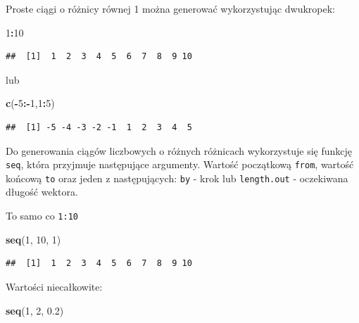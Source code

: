 \documentclass[]{book}
\newenvironment{Shaded}{\begin{snugshade}}{\end{snugshade}}
\newcommand{\KeywordTok}[1]{\textcolor[rgb]{0.13,0.29,0.53}{\textbf{#1}}}
\newcommand{\DecValTok}[1]{\textcolor[rgb]{0.00,0.00,0.81}{#1}}
\newcommand{\FloatTok}[1]{\textcolor[rgb]{0.00,0.00,0.81}{#1}}
\newcommand{\OperatorTok}[1]{\textcolor[rgb]{0.81,0.36,0.00}{\textbf{#1}}}
\newcommand{\NormalTok}[1]{#1}
\begin{document}
Proste ciągi o różnicy równej 1 można generować wykorzystując dwukropek:

\begin{Shaded}
\begin{Highlighting}[]
\DecValTok{1}\OperatorTok{:}\DecValTok{10}
\end{Highlighting}
\end{Shaded}

\begin{verbatim}
##  [1]  1  2  3  4  5  6  7  8  9 10
\end{verbatim}

lub

\begin{Shaded}
\begin{Highlighting}[]
\KeywordTok{c}\NormalTok{(}\OperatorTok{-}\DecValTok{5}\OperatorTok{:-}\DecValTok{1}\NormalTok{,}\DecValTok{1}\OperatorTok{:}\DecValTok{5}\NormalTok{)}
\end{Highlighting}
\end{Shaded}

\begin{verbatim}
##  [1] -5 -4 -3 -2 -1  1  2  3  4  5
\end{verbatim}

Do generowania ciągów liczbowych o różnych różnicach wykorzystuje się
funkcję \texttt{seq}, która przyjmuje następujące argumenty. Wartość
początkową \texttt{from}, wartość końcową \texttt{to} oraz jeden z
następujących: \texttt{by} - krok lub \texttt{length.out} - oczekiwana
długość wektora.

To samo co \texttt{1:10}

\begin{Shaded}
\begin{Highlighting}[]
\KeywordTok{seq}\NormalTok{(}\DecValTok{1}\NormalTok{, }\DecValTok{10}\NormalTok{, }\DecValTok{1}\NormalTok{)}
\end{Highlighting}
\end{Shaded}

\begin{verbatim}
##  [1]  1  2  3  4  5  6  7  8  9 10
\end{verbatim}

Wartości niecałkowite:

\begin{Shaded}
\begin{Highlighting}[]
\KeywordTok{seq}\NormalTok{(}\DecValTok{1}\NormalTok{, }\DecValTok{2}\NormalTok{, }\FloatTok{0.2}\NormalTok{)}
\end{Highlighting}
\end{Shaded}
\end{document}
